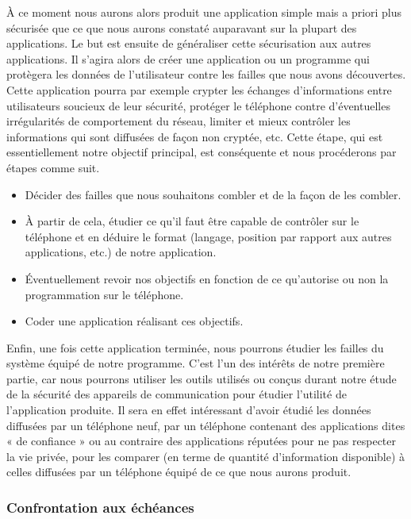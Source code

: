 \documentclass[a4paper, 12pt,twoside]{article}
\begin{document}
		À ce moment nous aurons alors produit une application simple mais a priori plus sécurisée que ce que nous aurons constaté auparavant sur la plupart des applications. Le but est ensuite de généraliser cette sécurisation aux autres applications. Il s'agira alors de créer une application ou un programme qui protègera les données de l'utilisateur contre les failles que nous avons découvertes. Cette application pourra par exemple crypter les échanges d'informations entre utilisateurs soucieux de leur sécurité, protéger le téléphone contre d'éventuelles irrégularités de comportement du réseau, limiter et mieux contrôler les informations qui sont diffusées de façon non cryptée, etc. Cette étape, qui est essentiellement notre objectif principal, est conséquente et nous procéderons par étapes comme suit.
		
		\begin{itemize}\setlength{\parskip}{0pt}
			\item Décider des failles que nous souhaitons combler et de la façon de les combler.
			\item À partir de cela, étudier ce qu'il faut être capable de contrôler sur le téléphone et en déduire le format (langage, position par rapport aux autres applications, etc.) de notre application.
			\item Éventuellement revoir nos objectifs en fonction de ce qu'autorise ou non la programmation sur le téléphone.
			\item Coder une application réalisant ces objectifs.
		\end{itemize}
		
		Enfin, une fois cette application terminée, nous pourrons étudier les failles du système équipé de notre programme. C'est l'un des intérêts de notre première partie, car nous pourrons utiliser les outils utilisés ou conçus durant notre étude de la sécurité des appareils de communication pour étudier l'utilité de l'application produite. Il sera en effet intéressant d'avoir étudié les données diffusées par un téléphone neuf, par un téléphone contenant des applications dites «  de confiance  » ou au contraire des applications réputées pour ne pas respecter la vie privée, pour les comparer (en terme de quantité d'information disponible) à celles diffusées par un téléphone équipé de ce que nous aurons produit.
		
		\subsubsection{Confrontation aux échéances}
		
\end{document}
